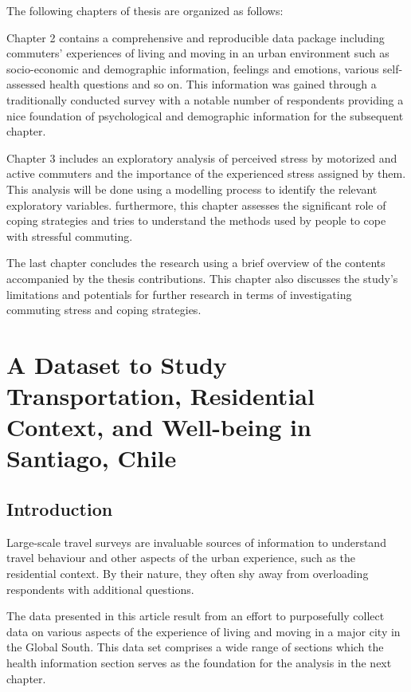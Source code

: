 \documentclass[
11pt, %
oneside, %
english, %
singlespacing, %
]{macthesis} %
\begin{document}
The following chapters of thesis are organized as follows:

Chapter 2 contains a comprehensive and reproducible data package including commuters' experiences of living and moving in an urban environment such as socio-economic and demographic information, feelings and emotions, various self-assessed health questions and so on. This information was gained through a traditionally conducted survey with a notable number of respondents providing a nice foundation of psychological and demographic information for the subsequent chapter.

Chapter 3 includes an exploratory analysis of perceived stress by motorized and active commuters and the importance of the experienced stress assigned by them. This analysis will be done using a modelling process to identify the relevant exploratory variables. furthermore, this chapter assesses the significant role of coping strategies and tries to understand the methods used by people to cope with stressful commuting.

The last chapter concludes the research using a brief overview of the contents accompanied by the thesis contributions. This chapter also discusses the study's limitations and potentials for further research in terms of investigating commuting stress and coping strategies.

\hypertarget{a-dataset-to-study-transportation-residential-context-and-well-being-in-santiago-chile}{%
\chapter{A Dataset to Study Transportation, Residential Context, and Well-being in Santiago, Chile}\label{a-dataset-to-study-transportation-residential-context-and-well-being-in-santiago-chile}}

\hypertarget{introduction-2}{%
\section{Introduction}\label{introduction-2}}

Large-scale travel surveys are invaluable sources of information to understand travel behaviour and other aspects of the urban experience, such as the residential context. By their nature, they often shy away from overloading respondents with additional questions.

The data presented in this article result from an effort to purposefully collect data on various aspects of the experience of living and moving in a major city in the Global South. This data set comprises a wide range of sections which the health information section serves as the foundation for the analysis in the next chapter.
\end{document}
